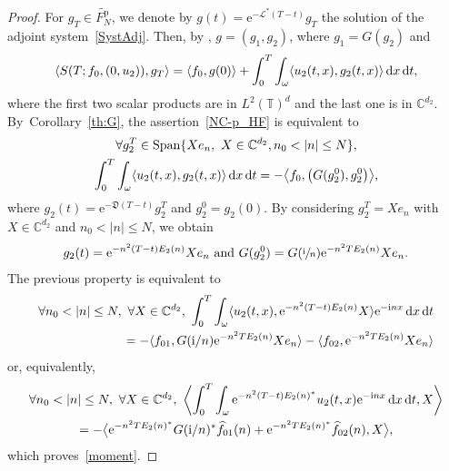 \documentclass[JEP,XML,SOM,Unicode,NoEqCountersInSection]{cedram}
\let\mathcal\mathscr
\theoremstyle{plain}
\theoremstyle{definition}
\theoremstyle{remark}
\DeclareMathOperator{\Span}{Span}
\newcommand{\diff}[1][-3]{\ensuremath{\mathop{}\mkern#1mu\mathrm{d}}}
\newcommand{\set}{\mathbb}
\renewcommand{\C}{\set{C}}
\newcommand{\T}{\set{T}}
\newcommand{\p}{{\mathrm p}}
\newcommand{\eu}{\mathrm e}
\newcommand{\iu}{\mathrm i}
\let\originalleft\left
\let\originalright\right
\renewcommand{\left}{\mathopen{}\mathclose\bgroup\originalleft}
\renewcommand{\right}{\aftergroup\egroup\originalright}
\begin{document}
\begin{proof}
For $g_T \in \widetilde{F^\p_N}$, we denote by $g(t)=\eu^{-\mathcal{L}^*(T-t)}g_T$ the solution of the adjoint system~\eqref{SystAdj}. Then, by , $g=(g_1,g_2)$, where $g_1=G(g_2)$ and
\[
\left\langle S(T;f_0,(0,u_2)), g_T \right\rangle = \left\langle f_0, g(0) \right\rangle + \int_0^T \int_{\omega} \left\langle u_2(t,x), g_2(t,x) \right\rangle \diff x \diff t,
\]
where the first two scalar products are in $L^2(\T)^{d}$ and the last one is in $\C^{d_2}$.
By~Corollary~\ref{th:G}, the assertion~\eqref{NC-p_HF} is equivalent to
\begin{multline}
\forall g_{2}^T \in \Span\{X e_n,\ X\in\C^{d_2}, n_0<|n|\leq N\},\\
\int_0^T \int_{\omega} \langle u_2(t,x), g_2(t,x) \rangle \diff x \diff t = -
\left\langle f_0, \left(G(g_2^0),g_2^0\right) \right\rangle,\end{multline}
where $g_2(t)=\eu^{-\mathfrak{D}(T-t)} g_2^T$ and $g_2^0=g_2(0)$.
By considering $g_2^T = X e_n$ with $X \in \C^{d_2}$ and $n_0 < |n|\leq N$, we obtain
\[
g_2(t)=\eu^{-n^2(T-t)E_2(n)} X e_n \text{ and }
G(g_2^0)=G\left(\sfrac{\iu}{n}\right)\eu^{-n^2 T E_2(n)} X e_n.
\]
The previous property is equivalent to
\begin{align*}
\forall n_0 < |n|\leq N,\ \forall X \in \C^{d_2}, \
\int_0^T \int_{\omega} \langle u_2(t,x), \eu^{-n^2(T-t)E_2(n)} X \rangle \eu^{-\iu nx} \diff x \diff t \\
= -
\langle f_{01}, G(\iu /n)\eu^{-n^2 T E_2(n)} X e_n \rangle - \langle f_{02}, \eu^{-n^2 T E_2(n)} X e_n \rangle
\end{align*}
or, equivalently,
\begin{multline*}
\forall n_0 < |n|\leq N,\ \forall X \in \C^{d_2}, \
\biggl\langle \int_0^T \int_{\omega} \eu^{-n^2(T-t)E_2(n)^*} u_2(t,x) \eu^{-\iu nx} \diff x \diff t, X \biggr\rangle\\
= -
\bigl\langle \eu^{-n^2 T E_2(n)^*} G(\iu /n)^* \widehat{f}_{01}(n) + \eu^{-n^2 T E_2(n)^*} \widehat{f}_{02}(n), X \bigr\rangle,
\end{multline*}
which proves~\eqref{moment}.


\end{proof}
\end{document}
